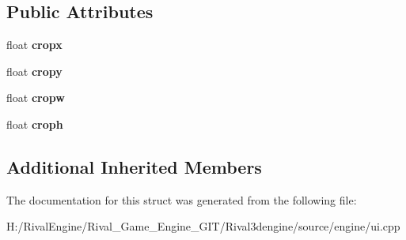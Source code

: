 \subsection*{Public Attributes}
\begin{DoxyCompactItemize}
\item 
\mbox{\label{struct_u_i_1_1_cropped_image_af95202739e42261310d00b2b90486cfa}} 
float {\bfseries cropx}
\item 
\mbox{\label{struct_u_i_1_1_cropped_image_a5f21c6523787dfe187e779eb6ec07184}} 
float {\bfseries cropy}
\item 
\mbox{\label{struct_u_i_1_1_cropped_image_aa917c3b6e41a5014eec3c246537ccbe5}} 
float {\bfseries cropw}
\item 
\mbox{\label{struct_u_i_1_1_cropped_image_aae518ee79e4e6828d12fa7fa9617c799}} 
float {\bfseries croph}
\end{DoxyCompactItemize}
\subsection*{Additional Inherited Members}


The documentation for this struct was generated from the following file\+:\begin{DoxyCompactItemize}
\item 
H\+:/\+Rival\+Engine/\+Rival\+\_\+\+Game\+\_\+\+Engine\+\_\+\+G\+I\+T/\+Rival3dengine/source/engine/ui.\+cpp\end{DoxyCompactItemize}
